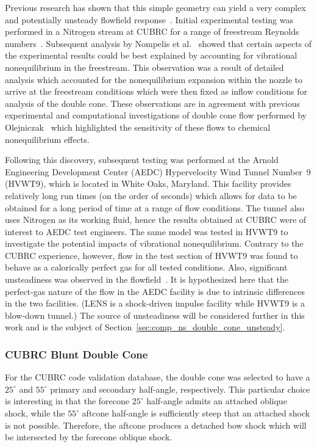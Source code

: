 Previous research has shown that this simple geometry can yield a very complex and potentially unsteady flowfield response~\cite{nompelis_candler_holden_double_cone,AEDC_HVWT9_double_cone}.  Initial experimental testing was performed in a Nitrogen stream at CUBRC for a range of freestream Reynolds numbers~\cite{holden_wadhams_AIAA-2003-1137}.  Subsequent analysis by Nompelis et al.~\cite{nompelis_candler_holden_double_cone} showed that certain aspects of the experimental results could be best explained by accounting for vibrational nonequilibrium in the freestream.  This observation was a result of detailed analysis which accounted for the nonequilibrium expansion within the nozzle to arrive at the freestream conditions which were then fixed as inflow conditions for analysis of the double cone.  These observations are in agreement with previous experimental and computational investigations of double cone flow performed by Olejniczak~\cite{olejniczak_dissertation} which highlighted the sensitivity of these flows to chemical nonequilibrium effects.

Following this discovery, subsequent testing was performed at the Arnold Engineering Development Center (AEDC) Hypervelocity Wind Tunnel Number~9 (HVWT9), which is located in White Oaks, Maryland.  This facility provides relatively long run times (on the order of seconds) which allows for data to be obtained for a long period of time at a range of flow conditions.  The tunnel also uses Nitrogen as its working fluid, hence the results obtained at CUBRC were of interest to AEDC test engineers. The same model was tested in HVWT9 to investigate the potential impacts of vibrational nonequilibrium.  Contrary to the CUBRC experience, however, flow in the test section of HVWT9 was found to behave as a calorically perfect gas for all tested conditions. Also, significant unsteadiness was observed in the flowfield~\cite{AEDC_HVWT9_double_cone}. It is hypothesized here that the perfect-gas nature of the flow in the AEDC facility is due to intrinsic differences in the two facilities. (LENS is a shock-driven impulse facility while HVWT9 is a blow-down tunnel.) The source of unsteadiness will be considered further in this work and is the subject of Section~\ref{sec:comp_ns_double_cone_unsteady}.

\subsubsection{CUBRC Blunt Double Cone}
For the CUBRC code validation database, the double cone was selected to have a $25^\circ$ and $55^\circ$ primary and secondary half-angle, respectively. This particular choice is interesting in that the forecone $25^\circ$ half-angle admits an attached oblique shock, while the $55^\circ$ aftcone half-angle is sufficiently steep that an attached shock is not possible.  Therefore, the aftcone produces a detached bow shock which will be intersected by the forecone oblique shock.

